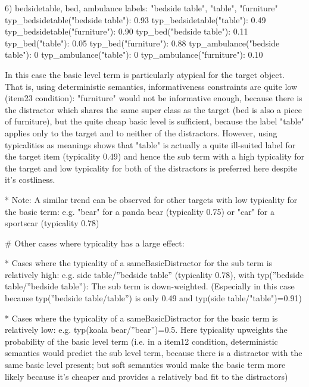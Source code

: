 6) bedsidetable, bed, ambulance
	labels: "bedside table", "table", "furniture"
	typ_bedsidetable("bedside table"): 0.93
	typ_bedsidetable("table"): 0.49
	typ_bedsidetable("furniture"): 0.90
	typ_bed("bedside table"): 0.11
	typ_bed("table"): 0.05
	typ_bed("furniture"): 0.88
	typ_ambulance("bedside table"): 0
	typ_ambulance("table"): 0
	typ_ambulance("furniture"): 0.10

	In this case the basic level term is particularly atypical for the target object. That is, using deterministic semantics, informativeness constraints are quite low (item23 condition): "furniture" would not be informative enough, because there is the distractor which shares the same super class as the target (bed is also a piece of furniture), but the quite cheap basic level is sufficient, because the label "table" applies only to the target and to neither of the distractors. However, using typicalities as meanings shows that "table" is actually a quite ill-suited label for the target item (typicality 0.49) and hence the sub term with a high typicality for the target and low typicality for both of the distractors is preferred here despite it's costliness.

	* Note: A similar trend can be observed for other targets with low typicality for the basic term: e.g. "bear" for a panda bear (typicality 0.75) or "car" for a sportscar (typicality 0.78)



	# Other cases where typicality has a large effect:

	* Cases where the typicality of a sameBasicDistractor for the sub term is relatively high: e.g. side table/”bedside table” (typicality 0.78), with typ(”bedside table/”bedside table”): The sub term is down-weighted. (Especially in this case because typ(”bedside table/table”) is only 0.49 and typ(side table/"table")=0.91)

	* Cases where the typicality of a sameBasicDistractor for the basic term is relatively low: e.g. typ(koala bear/”bear”)=0.5. Here typicality upweights the probability of the basic level term (i.e. in a item12 condition, deterministic semantics would predict the sub level term, because there is a distractor with the same basic level present; but soft semantics would make the basic term more likely because it's cheaper and provides a relatively bad fit to the distractors)



